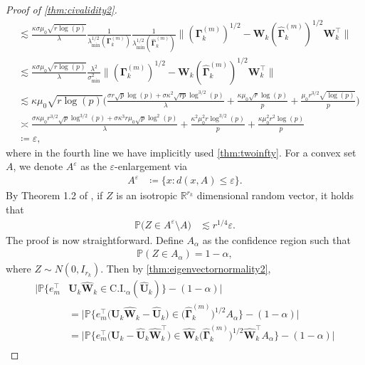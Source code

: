 \documentclass[10pt]{article}
\newcommand{\0}{{\mathbf{0}}}
\newcommand{\1}{{\mathbf{1}}}
\newcommand{\U}{{\mathbf{U}}}
\renewcommand{\citet}{\cite}
\renewcommand{\t}{^{\top}}
\newcommand{\uhat}{\mathbf{\hat{U}}}
\newcommand{\p}{\mathbb{P}}
\renewcommand{\hat}{\widehat}
\renewcommand{\hat}{\widehat}
\begin{document}
\begin{proof}[Proof of \cref{thm:civalidity2}]
\begin{align*}
    &\lesssim \frac{\kappa \sigma\mu_0 \sqrt{r\log(p)}}{\lambda} \frac{1}{\lambda_{\min}^{1/2}(\mathbf{\Gamma}^{(m)}_k)} \frac{1}{\lambda_{\min}^{1/2}(\mathbf{\hat \Gamma}^{(m)}_k)} \| (\mathbf{\Gamma}^{(m)}_k)^{1/2} - \mathbf{W}_k(\mathbf{\hat \Gamma}^{(m)}_k)^{1/2}\mathbf{W}_k\t \| \\
    &\lesssim \frac{\kappa \sigma \mu_0 \sqrt{r\log(p)}}{\lambda} \frac{\lambda^2}{\sigma_{\min}^2} \| (\mathbf{\Gamma}^{(m)}_k)^{1/2} - \mathbf{W}_k(\mathbf{\hat \Gamma}^{(m)}_k)^{1/2}\mathbf{W}_k\t \| \\
    &\lesssim \kappa \mu_0 \sqrt{r\log(p)} \bigg( \frac{\sigma r \sqrt{p}\log(p) + \sigma \kappa^2 \sqrt{rp} \log^{3/2}(p)}{\lambda} + \frac{\kappa \mu_0 \sqrt{r} \log(p)}{p} + \frac{\mu_0 r^{3/2} \sqrt{\log(p)}}{p} \bigg) \\
    &\asymp \frac{ \sigma \kappa \mu_0 r^{3/2} \sqrt{p} \log^{3/2}(p) + \sigma \kappa^3 r \mu_0 \sqrt{p} \log^2(p)}{\lambda} + \frac{\kappa^2 \mu_0^2 r \log^{3/2}(p)}{p} + \frac{\kappa \mu_0^2 r^2 \log(p)}{p}\\
    &\coloneqq \varepsilon,
\end{align*}
where in the fourth line we have implicitly used \cref{thm:twoinfty}.  For a convex set $A$, we denote $A^{\varepsilon}$ as the $\varepsilon$-enlargement via
\begin{align*}
    A^{\varepsilon} &\coloneqq \{ x: d(x,A) \leq \varepsilon \}.
\end{align*}
By Theorem 1.2 of \citet{raicv_multivariate_2019}, if $Z$ is an isotropic $\mathbb{R}^{r_k}$ dimensional random vector, it holds that
\begin{align*}
    \p\bigg( Z \in A^{\varepsilon} \setminus A \bigg) &\lesssim r^{1/4} \varepsilon.
\end{align*}
The proof is now straightforward.  Define $A_{\alpha}$ as the confidence region such that
\begin{align*}
    \p( Z \in A_{\alpha} ) = 1 - \alpha,
\end{align*}
where $Z \sim N(0, I_{r_k})$.  Then by \cref{thm:eigenvectornormality2}, 
\begin{align*}
    \bigg| \p\bigg\{ e_m\t& \U_k \mathbf{\hat W}_k \in \mathrm{C.I.}_{\alpha} (\uhat_k) \bigg\}  - (1-\alpha) \bigg| \\
    &= \bigg| \p\bigg\{ e_m\t \bigg(  \U_k \mathbf{\hat W}_k - \uhat_k \bigg) \in \big(\mathbf{\hat \Gamma}^{(m)}_k\big)^{1/2} A_{\alpha} \bigg\} - (1 - \alpha) \bigg| \\
    &=\bigg| \p\bigg\{ e_m\t \bigg( \U_k - \uhat_k \mathbf{\hat W}_k\t \bigg) \in  \mathbf{\hat W}_k \big(\mathbf{\hat \Gamma}^{(m)}_k\big)^{1/2} \mathbf{\hat W}_k\t A_{\alpha} \bigg\} - (1-\alpha) \bigg| \\

\end{align*}
\end{proof}
\end{document}
